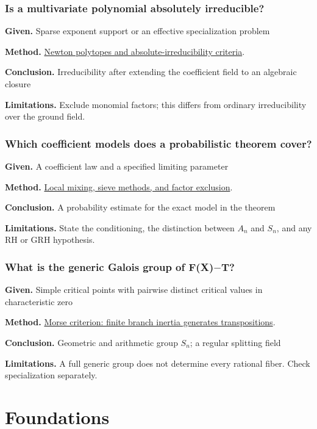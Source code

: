 \documentclass[11pt,a4paper,oneside,openany]{book}
\begin{document}
\section*{Is a multivariate polynomial absolutely irreducible?}
\textbf{Given.} Sparse exponent support or an effective specialization problem\par
\textbf{Method.} \hyperlink{article:multivariate-irreducibility}{Newton polytopes and absolute-irreducibility criteria}.\par
\textbf{Conclusion.} Irreducibility after extending the coefficient field to an algebraic closure\par
\textbf{Limitations.} Exclude monomial factors; this differs from ordinary irreducibility over the ground field.\par\medskip
\section*{Which coefficient models does a probabilistic theorem cover?}
\textbf{Given.} A coefficient law and a specified limiting parameter\par
\textbf{Method.} \hyperlink{article:random-models}{Local mixing, sieve methods, and factor exclusion}.\par
\textbf{Conclusion.} A probability estimate for the exact model in the theorem\par
\textbf{Limitations.} State the conditioning, the distinction between \(A_n\) and \(S_n\), and any RH or GRH hypothesis.\par\medskip
\section*{What is the generic Galois group of F(X)\ensuremath{-}T?}
\textbf{Given.} Simple critical points with pairwise distinct critical values in characteristic zero\par
\textbf{Method.} \hyperlink{article:critical-points-monodromy}{Morse criterion: finite branch inertia generates transpositions}.\par
\textbf{Conclusion.} Geometric and arithmetic group \(S_n\); a regular splitting field\par
\textbf{Limitations.} A full generic group does not determine every rational fiber. Check specialization separately.\par\medskip
\mainmatter
\part{Foundations}
\end{document}
